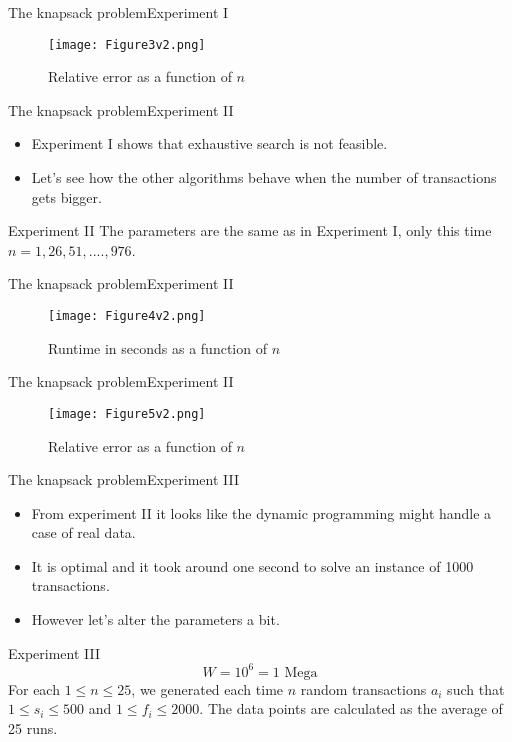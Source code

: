 \documentclass{beamer}
\begin{document}
\begin{frame}{The knapsack problem}{Experiment I} %
    \begin{figure}
        \centering
        \texttt{[image: Figure3v2.png]}
        \caption{Relative error as a function of $n$}
    \end{figure}
\end{frame}
\begin{frame}{The knapsack problem}{Experiment II} %
    \begin{itemize}
        \item {Experiment I shows that exhaustive search is not feasible.}
        \item {Let's see how the other algorithms behave when the number of 
        transactions gets bigger.}
    \end{itemize}
    \begin{block}{Experiment II}
    The parameters are the same as in Experiment I, only this time 
    $n = 1,26,51,....,976$.
    \end{block}
\end{frame}

\begin{frame}{The knapsack problem}{Experiment II} %
    \begin{figure}
        \centering
        \texttt{[image: Figure4v2.png]}
        \caption{Runtime in seconds as a function of $n$}
    \end{figure}
\end{frame}

\begin{frame}{The knapsack problem}{Experiment II} %
    \begin{figure}
        \centering
        \texttt{[image: Figure5v2.png]}
        \caption{Relative error as a function of $n$}
    \end{figure}
\end{frame}
\begin{frame}{The knapsack problem}{Experiment III} %
    \begin{itemize}
        \item {From experiment II it looks like the dynamic programming 
        might handle a case of real data.}
        \item {It is optimal and it took around one second to solve an 
        instance of 1000 transactions.}
        \item {However let's alter the parameters a bit.}
    \end{itemize}
    \begin{block}{Experiment III}
    $$ W= 10^6 = 1 \text{ Mega} $$ 
    For each $1\leq n \leq 25$, we generated each time $n$ random transactions
    $a_i$ such that $1\leq s_i\leq 500$ and $1\leq f_i \leq 2000$. The 
    data points are calculated as the average of 25 runs.
    \end{block}
\end{frame}
\end{document}
